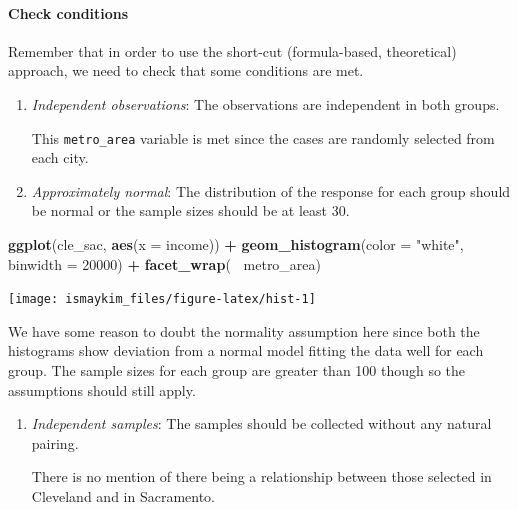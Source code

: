 \documentclass[12pt,]{krantz}
\makeatletter
\newenvironment{Shaded}{\begin{snugshade}}{\end{snugshade}}
\newcommand{\KeywordTok}[1]{\textcolor[rgb]{0.27,0.27,0.27}{\textbf{#1}}}
\newcommand{\DataTypeTok}[1]{\textcolor[rgb]{0.27,0.27,0.27}{#1}}
\newcommand{\DecValTok}[1]{\textcolor[rgb]{0.06,0.06,0.06}{#1}}
\newcommand{\StringTok}[1]{\textcolor[rgb]{0.5,0.5,0.5}{#1}}
\newcommand{\OperatorTok}[1]{\textcolor[rgb]{0.43,0.43,0.43}{\textbf{#1}}}
\newcommand{\NormalTok}[1]{#1}
\let\oldparagraph\paragraph
\renewcommand{\paragraph}[1]{\oldparagraph{#1}\mbox{}}
\newenvironment{kframe}{%
\medskip{}
\setlength{\fboxsep}{.8em}
 \def\at@end@of@kframe{}%
 \ifinner\ifhmode%
  \def\at@end@of@kframe{\end{minipage}}%
  \begin{minipage}{\columnwidth}%
 \fi\fi%
 \def\FrameCommand##1{\hskip\@totalleftmargin \hskip-\fboxsep
 \colorbox{shadecolor}{##1}\hskip-\fboxsep
     \hskip-\linewidth \hskip-\@totalleftmargin \hskip\columnwidth}%
 \MakeFramed {\advance\hsize-\width
   \@totalleftmargin\z@ \linewidth\hsize
   \@setminipage}}%
 {\par\unskip\endMakeFramed%
 \at@end@of@kframe}
\renewenvironment{Shaded}{\begin{kframe}}{\end{kframe}}
\makeatother
\begin{document}
\paragraph{Check conditions}\label{check-conditions-3}

Remember that in order to use the short-cut (formula-based, theoretical)
approach, we need to check that some conditions are met.

\begin{enumerate}
\def\labelenumi{\arabic{enumi}.}
\item
  \emph{Independent observations}: The observations are independent in
  both groups.

  This \texttt{metro\_area} variable is met since the cases are randomly
  selected from each city.
\item
  \emph{Approximately normal}: The distribution of the response for each
  group should be normal or the sample sizes should be at least 30.
\end{enumerate}

\begin{Shaded}
\begin{Highlighting}[]
\KeywordTok{ggplot}\NormalTok{(cle_sac, }\KeywordTok{aes}\NormalTok{(}\DataTypeTok{x =}\NormalTok{ income)) }\OperatorTok{+}
\StringTok{  }\KeywordTok{geom_histogram}\NormalTok{(}\DataTypeTok{color =} \StringTok{"white"}\NormalTok{, }\DataTypeTok{binwidth =} \DecValTok{20000}\NormalTok{) }\OperatorTok{+}
\StringTok{  }\KeywordTok{facet_wrap}\NormalTok{(}\OperatorTok{~}\StringTok{ }\NormalTok{metro_area)}
\end{Highlighting}
\end{Shaded}

\begin{center}\texttt{[image: ismaykim\_files/figure-latex/hist-1]} \end{center}

We have some reason to doubt the normality assumption here since both
the histograms show deviation from a normal model fitting the data well
for each group. The sample sizes for each group are greater than 100
though so the assumptions should still apply.

\begin{enumerate}
\def\labelenumi{\arabic{enumi}.}
\setcounter{enumi}{2}
\item
  \emph{Independent samples}: The samples should be collected without
  any natural pairing.

  There is no mention of there being a relationship between those
  selected in Cleveland and in Sacramento.
\end{enumerate}
\end{document}
